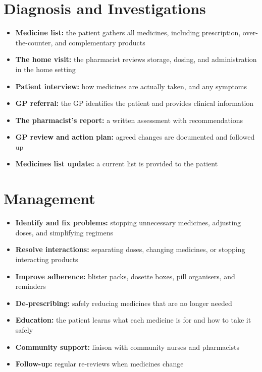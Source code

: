 \section*{Diagnosis and Investigations}
\begin{itemize}
    \item \textbf{Medicine list:} the patient gathers all medicines, including prescription, over-the-counter, and complementary products
    \item \textbf{The home visit:} the pharmacist reviews storage, dosing, and administration in the home setting
    \item \textbf{Patient interview:} how medicines are actually taken, and any symptoms
    \item \textbf{GP referral:} the GP identifies the patient and provides clinical information
    \item \textbf{The pharmacist's report:} a written assessment with recommendations
    \item \textbf{GP review and action plan:} agreed changes are documented and followed up
    \item \textbf{Medicines list update:} a current list is provided to the patient
\end{itemize}

\section*{Management}
\begin{itemize}
    \item \textbf{Identify and fix problems:} stopping unnecessary medicines, adjusting doses, and simplifying regimens
    \item \textbf{Resolve interactions:} separating doses, changing medicines, or stopping interacting products
    \item \textbf{Improve adherence:} blister packs, dosette boxes, pill organisers, and reminders
    \item \textbf{De-prescribing:} safely reducing medicines that are no longer needed
    \item \textbf{Education:} the patient learns what each medicine is for and how to take it safely
    \item \textbf{Community support:} liaison with community nurses and pharmacists
    \item \textbf{Follow-up:} regular re-reviews when medicines change
\end{itemize}

